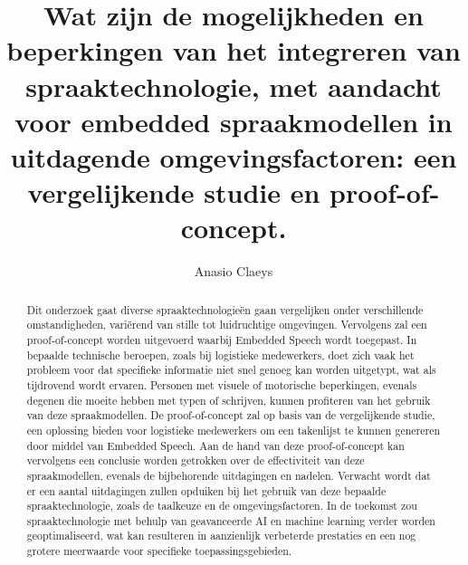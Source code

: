\documentclass{hogent-article}
\title{Wat zijn de mogelijkheden en beperkingen van het integreren van spraaktechnologie, met aandacht voor embedded spraakmodellen in uitdagende omgevingsfactoren: een vergelijkende studie en proof-of-concept.}
\author{Anasio Claeys}
\begin{document}
\begin{abstract}
  
Dit onderzoek gaat diverse spraaktechnologieën gaan vergelijken onder verschillende omstandigheden, variërend van stille tot luidruchtige omgevingen. 
Vervolgens zal een proof-of-concept worden uitgevoerd waarbij Embedded Speech wordt toegepast. In bepaalde technische beroepen, zoals bij logistieke medewerkers, doet zich vaak het probleem 
voor dat specifieke informatie niet snel genoeg kan worden uitgetypt, wat als tijdrovend wordt ervaren. 
Personen met visuele of motorische beperkingen, evenals degenen die moeite hebben met typen of schrijven, 
kunnen profiteren van het gebruik van deze spraakmodellen. De proof-of-concept zal op basis van de vergelijkende studie, een oplossing bieden voor logistieke medewerkers om een takenlijst 
te kunnen genereren door middel van Embedded Speech. Aan de hand van deze proof-of-concept kan vervolgens een conclusie worden getrokken over de effectiviteit van deze spraakmodellen, 
evenals de bijbehorende uitdagingen en nadelen. Verwacht wordt dat er een aantal uitdagingen zullen opduiken bij het gebruik van deze bepaalde spraaktechnologie, zoals de taalkeuze 
en de omgevingsfactoren. In de toekomst zou spraaktechnologie met behulp van geavanceerde AI en machine learning verder worden geoptimaliseerd, wat kan resulteren in aanzienlijk verbeterde 
prestaties en een nog grotere meerwaarde voor specifieke toepassingsgebieden.
\end{abstract}

\tableofcontents



\printbibliography[heading=bibintoc]
\end{document}
